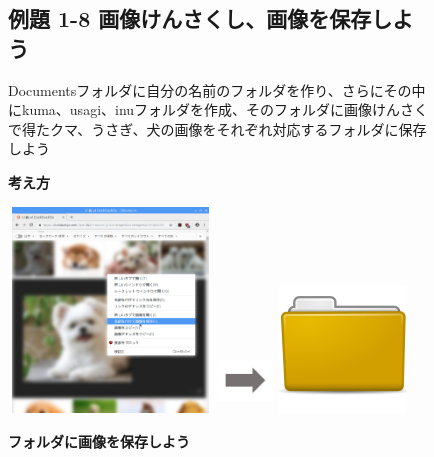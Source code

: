 \documentclass[a4paper,12pt]{jarticle}
\begin{document}
\begin{figure}[t]
  \subsection{例題 1-8
    画像けんさくし、画像を保存しよう}
  Documentsフォルダに自分の名前のフォルダを作り、さらにその中にkuma、usagi、inuフォルダを作成、そのフォルダに画像けんさくで得たクマ、うさぎ、犬の画像をそれぞれ対応するフォルダに保存しよう

  \textbf{考え方}


  \bigskip




  \centering
  \begin{minipage}{\textwidth}
    \begin{minipage}{5.582cm}
      \includegraphics[width=5.413cm,height=5.461cm]{textbook-img092.png}
    \end{minipage}
    \begin{minipage}{3.582cm}
      \includegraphics[width=1.505cm,height=1.707cm]{textbook-img073.png}
    \end{minipage}
    \begin{minipage}{5.582cm}
      \includegraphics[width=3.387cm,height=3.387cm]{textbook-img044.png}
    \end{minipage}
  \end{minipage}


  \flushleft
  {\bfseries
    フォルダに画像を保存しよう}


\end{figure}
\end{document}
